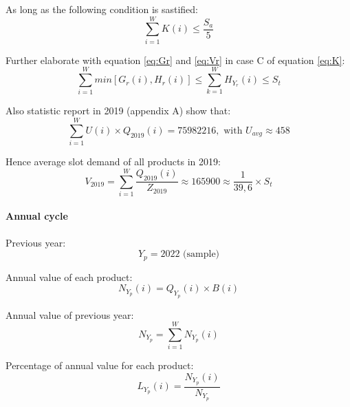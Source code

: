     As long as the following condition is sastified:
    \begin{equation}\label{eq:conditionK}
        \sum_{i=1}^{W} K(i) \leq \frac{S_a}{5}
    \end{equation}

    Further elaborate with equation \eqref{eq:Gr} and \eqref{eq:Vr} in case C of equation \eqref{eq:K}:
    \begin{equation}\label{eq:elaborate first cycle}
        \sum_{i=1}^{W} min[G_r(i),H_r(i)] \leq 
        \sum_{k=1}^{W} H_{Y_r}(i)
        \leq S_t
    \end{equation}

    Also statistic report in 2019 (appendix A) show that:
    \begin{equation}\label{eq:report 2019}
        \sum_{i=1}^{W} U(i) \times Q_{2019}(i) = 75982216, 
        \text{ with } U_{avg} \approx 458
    \end{equation}

    Hence average slot demand of all products in 2019:
    \begin{equation}\label{eq:sample 2019}
        V_{2019} = \sum_{i=1}^{W} \frac{Q_{2019}(i)}{Z_{2019}} \approx 165900 
        \approx \frac{1}{39,6} \times S_t
    \end{equation}

\paragraph{Annual cycle}\mbox{}

    Previous year:
    \begin{equation}\label{eq:Yp}
        Y_p = 2022 \text{ (sample)}
    \end{equation}

    Annual value of each product:
    \begin{equation}\label{eq:NYpi}
        N_{Y_p}(i) = Q_{Y_p}(i) \times B(i)
    \end{equation}

    Annual value of previous year:
    \begin{equation}\label{eq:NYp}
        N_{Y_p} = \sum_{i=1}^{W} N_{Y_p }(i) 
    \end{equation}

    Percentage of annual value for each product:
    \begin{equation}\label{eq:LYpi}
        L_{Y_p}(i) = \frac{N_{Y_p }(i)}{ N_{Y_p }}
    \end{equation}

